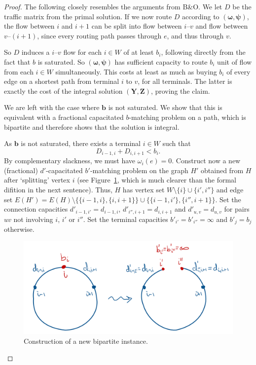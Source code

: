 \documentclass[11pt]{article}
\begin{document}
\begin{proof}
        The following closely resembles the arguments from B\&O\@.
        We let $D$ be the traffic matrix from the primal solution.
        If we now route $D$ according to $(\boldsymbol \omega, \boldsymbol \psi)$, the flow between $i$ and $i+1$ can be split into flow between $i$--$v$ and flow between $v$--$(i+1)$, since every routing path passes through $e$, and thus through $v$.

        So $D$ induces a $i$--$v$ flow for each $i \in W$ of at least $b_i$, following directly from the fact that $b$ is saturated.
        So $(\boldsymbol \omega, \boldsymbol \psi)$ has sufficient capacity to route $b_i$ unit of flow from each $i \in W$ simultaneously.
        This costs at least as much as buying $b_i$ of every edge on a shortest path from terminal $i$ to $v$, for all terminals.
        The latter is exactly the cost of the integral solution $(\boldsymbol Y, \boldsymbol Z)$, proving the claim.

        We are left with the case where $\boldsymbol b$ is not saturated.
        We show that this is equivalent with a fractional capacitated $b$-matching problem on a path, which is bipartite and therefore shows that the solution is integral.

        As $\boldsymbol b$ is not saturated, there exists a terminal $i \in W$ such that
        \[
            D_{i-1,i} + D_{i,i+1} < b_i.
        \]
        By complementary slackness, we must have $\omega_i(e) = 0$.
        Construct now a new (fractional) $d'$-capacitated $b'$-matching problem on the graph $H'$ obtained from $H$ after `splitting' vertex $i$ (see Figure~\ref{fig:split}, which is much clearer than the formal difition in the next sentence).
        Thus, $H$ has vertex set $W\setminus \{i\} \cup \{i', i''\}$ and edge set $E(H') = E(H) \setminus \{ \{i-1,i\}, \{i, i+1\} \} \cup \{ \{i-1, i'\}, \{i'', i+1\} \}$.
        Set the connection capacities $d'_{i-1,i'} = d_{i-1,i}$, $d'_{i'',i+1} = d_{i,i+1}$ and $d'_{u,v} = d_{u,v}$ for pairs $uv$ not involving $i$, $i'$ or $i''$.
        Set the terminal capacities $b'_{i'} = b'_{i''} = \infty$ and $b'_j = b_j$ otherwise.

        \begin{figure}[h]
            \centering
            \includegraphics[width=.65\textwidth]{split}
            \caption{Construction of a new bipartite instance.} \label{fig:split}
        \end{figure}


\end{proof}
\end{document}
